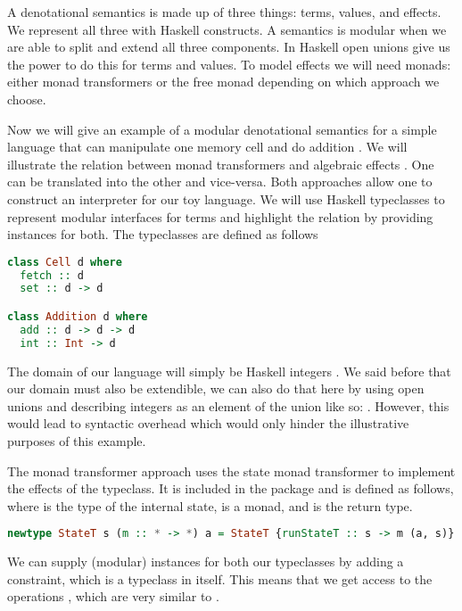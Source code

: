A denotational semantics is made up of three things: terms, values, and effects. We represent all three with Haskell constructs. A semantics is modular when we are able to split and extend all three components. In Haskell open unions give us the power to do this for terms and values. To model effects we will need monads: either monad transformers or the free monad depending on which approach we choose. %

Now we will give an example of a modular denotational semantics for a simple language that can manipulate one memory cell  and do addition . We will illustrate the relation between monad transformers and algebraic effects \cite{DBLP:conf/haskell/SchrijversPWJ19}. One can be translated into the other and vice-versa. Both approaches allow one to construct an interpreter for our toy language. We will use Haskell typeclasses to represent modular interfaces for terms and highlight the relation by providing instances for both. The typeclasses are defined as follows

\begin{lstlisting}[language=Haskell]
class Cell d where
  fetch :: d
  set :: d -> d

class Addition d where
  add :: d -> d -> d
  int :: Int -> d
\end{lstlisting}

The domain of our language will simply be Haskell integers . We said before that our domain must also be extendible, we can also do that here by using open unions and describing integers as an element of the union like so: . However, this would lead to syntactic overhead which would only hinder the illustrative purposes of this example.

The monad transformer approach uses the state monad transformer to implement the effects of the  typeclass. It is included in the  package and is defined as follows, where  is the type of the internal state,  is a monad, and  is the return type.

\begin{lstlisting}[language=Haskell]
newtype StateT s (m :: * -> *) a = StateT {runStateT :: s -> m (a, s)}
\end{lstlisting}

We can supply (modular) instances for both our typeclasses by adding a  constraint, which is a typeclass in itself. This means that we get access to the operations , which are very similar to .

